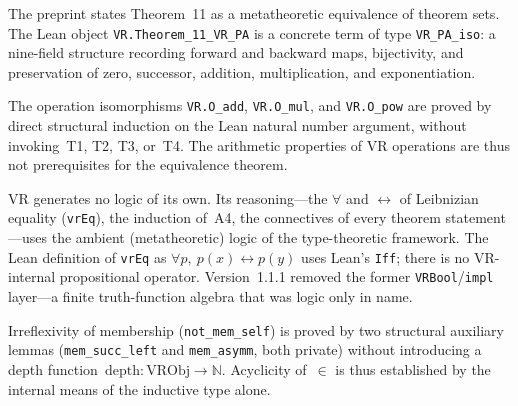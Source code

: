 \begin{remark}
\label{rem:T11_iso}
\leanok
The preprint states Theorem~11 as a metatheoretic equivalence of theorem
sets.  The Lean object \texttt{VR.Theorem\_11\_VR\_PA} is a concrete
term of type \texttt{VR\_PA\_iso}: a nine-field structure recording
forward and backward maps, bijectivity, and preservation of zero,
successor, addition, multiplication, and exponentiation.
\end{remark}

\begin{remark}
\label{rem:T1T4_not_needed}
\leanok
The operation isomorphisms \texttt{VR.O\_add}, \texttt{VR.O\_mul}, and
\texttt{VR.O\_pow} are proved by direct structural induction on the Lean
natural number argument, without invoking~T1, T2, T3, or~T4.  The
arithmetic properties of VR operations are thus not prerequisites for
the equivalence theorem.
\end{remark}

\begin{remark}
\label{rem:iff_two_senses}
\leanok
VR generates no logic of its own.  Its reasoning---the $\forall$ and
$\leftrightarrow$ of Leibnizian equality (\texttt{vrEq}), the induction
of~A4, the connectives of every theorem statement---uses the ambient
(metatheoretic) logic of the type-theoretic framework.  The Lean
definition of \texttt{vrEq} as $\forall p,\ p(x) \leftrightarrow p(y)$
uses Lean's \texttt{Iff}; there is no VR-internal propositional operator.
Version~1.1.1 removed the former \texttt{VRBool}/\texttt{impl} layer---a
finite truth-function algebra that was logic only in name.
\end{remark}

\begin{remark}
\label{rem:acyclicity_no_measure}
\leanok
Irreflexivity of membership (\texttt{not\_mem\_self}) is proved by two
structural auxiliary lemmas (\texttt{mem\_succ\_left} and
\texttt{mem\_asymm}, both private) without introducing a depth
function~$\mathrm{depth}: \mathrm{VRObj} \to \mathbb{N}$.  Acyclicity
of~$\in$ is thus established by the internal means of the inductive
type alone.
\end{remark}

